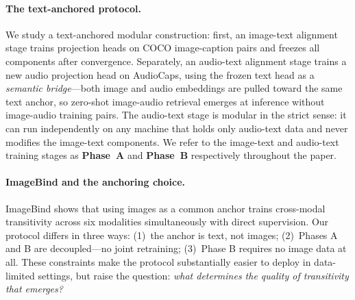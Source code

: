 \documentclass{article}
\begin{document}
\paragraph{The text-anchored protocol.}
We study a text-anchored modular construction: first, an image-text alignment stage trains projection heads on COCO image-caption pairs and freezes all components after convergence.
Separately, an audio-text alignment stage trains a new audio projection head on AudioCaps, using the frozen text head as a \emph{semantic bridge}---both image and audio embeddings are pulled toward the same text anchor, so zero-shot image-audio retrieval emerges at inference without image-audio training pairs.
The audio-text stage is modular in the strict sense: it can run independently on any machine that holds only audio-text data and never modifies the image-text components.
We refer to the image-text and audio-text training stages as \textbf{Phase~A} and \textbf{Phase~B} respectively throughout the paper.

\paragraph{ImageBind and the anchoring choice.}
ImageBind \citep{girdhar2023imagebind} shows that using images as a common anchor trains cross-modal transitivity across six modalities simultaneously with direct supervision.
Our protocol differs in three ways: (1)~the anchor is text, not images; (2)~Phases A and B are decoupled---no joint retraining; (3)~Phase B requires no image data at all.
These constraints make the protocol substantially easier to deploy in data-limited settings, but raise the question: \emph{what determines the quality of transitivity that emerges?}
\end{document}
